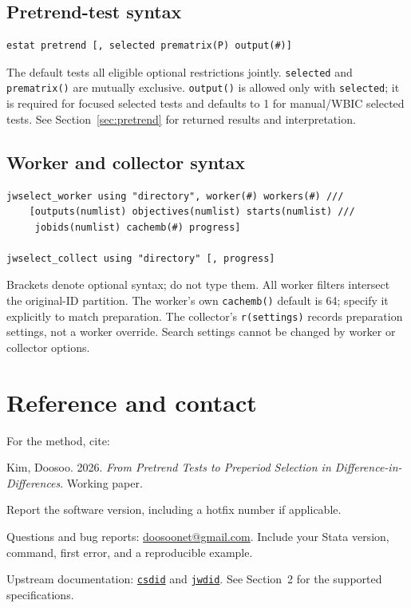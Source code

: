 \documentclass[11pt]{article}
\newcommand{\cmd}[1]{\texttt{#1}}
\begin{document}
\subsection*{Pretrend-test syntax}
\begin{lstlisting}
estat pretrend [, selected prematrix(P) output(#)]
\end{lstlisting}
The default tests all eligible optional restrictions jointly.
\cmd{selected} and \cmd{prematrix()} are mutually exclusive.
\cmd{output()} is allowed only with \cmd{selected}; it is required for focused
selected tests and defaults to 1 for manual/WBIC selected tests.
See Section~\ref{sec:pretrend} for returned results and interpretation.

\subsection*{Worker and collector syntax}
\begin{lstlisting}
jwselect_worker using "directory", worker(#) workers(#) ///
    [outputs(numlist) objectives(numlist) starts(numlist) ///
     jobids(numlist) cachemb(#) progress]

jwselect_collect using "directory" [, progress]
\end{lstlisting}
Brackets denote optional syntax; do not type them. All worker filters
intersect the original-ID partition. The worker's own \cmd{cachemb()} default
is 64; specify it explicitly to match preparation. The collector's
\cmd{r(settings)} records preparation settings, not a worker override.
Search settings cannot be changed by worker or collector options.

\section{Reference and contact}
For the method, cite:

Kim, Doosoo. 2026. \emph{From Pretrend Tests to Preperiod Selection in
Difference-in-Differences}. Working paper.

Report the software version, including a hotfix number if applicable.

Questions and bug reports: \href{mailto:doosoonet@gmail.com}{doosoonet@gmail.com}.
Include your Stata version, command, first error, and a reproducible example.

Upstream documentation: \href{https://psantanna.com/csdid/}{\cmd{csdid}} and
\href{https://friosavila.github.io/app_metrics/app_metrics11.html}{\cmd{jwdid}}.
See Section~2 for the supported specifications.
\end{document}
